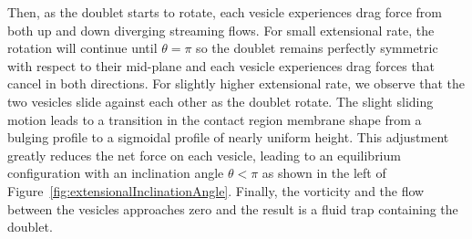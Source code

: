 \documentclass[prf,superscriptaddress,showpacs]{revtex4-1}
\begin{document}
Then, as the doublet
starts to rotate, each vesicle experiences drag force from both up and down diverging streaming flows.
For small extensional rate, the rotation will continue until $\theta = \pi$ so the doublet remains perfectly symmetric
with respect to their mid-plane  and each vesicle experiences drag forces that cancel in both directions.
For slightly higher extensional rate, we observe that the two vesicles slide against each other as the doublet rotate.
The slight sliding motion leads to a transition in the contact region membrane shape from a bulging profile to a sigmoidal profile of nearly uniform height.
This adjustment greatly reduces the net force on each vesicle, leading to an equilibrium configuration with an inclination angle $\theta < \pi$ as shown in 
the left of Figure~\ref{fig:extensionalInclinationAngle}.  Finally,
the vorticity and the flow between the vesicles approaches zero and the
result is a fluid trap containing the doublet.
\end{document}
